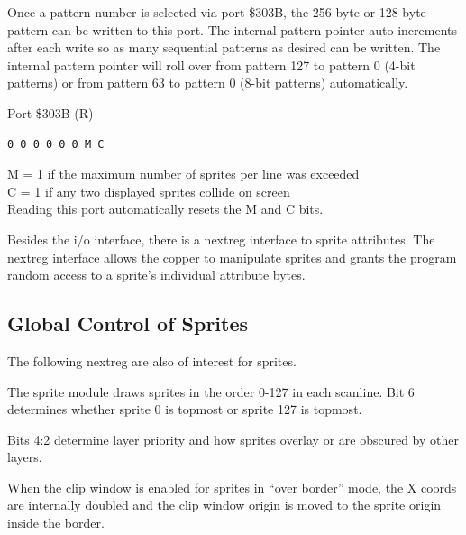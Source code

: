 

Once a pattern number is selected via port \$303B, the 256-byte or
128-byte pattern can be written to this port. The internal pattern
pointer auto-increments after each write so as many sequential
patterns as desired can be written. The internal pattern pointer will
roll over from pattern 127 to pattern 0 (4-bit patterns) or from
pattern 63 to pattern 0 (8-bit patterns) automatically.

Port \$303B (R)

\begin{verbatim}
0 0 0 0 0 0 M C
\end{verbatim}
M = 1 if the maximum number of sprites per line was exceeded\\
C = 1 if any two displayed sprites collide on screen\\
Reading this port automatically resets the M and C bits.

Besides the i/o interface, there is a nextreg interface to sprite
attributes. The nextreg interface allows the copper to manipulate
sprites and grants the program random access to a sprite’s individual
attribute bytes.













\subsection{Global Control of Sprites}

The following nextreg are also of interest for sprites.




The sprite module draws sprites in the order 0-127 in each
scanline. Bit 6 determines whether sprite 0 is topmost or sprite 127
is topmost.

Bits 4:2 determine layer priority and how sprites overlay or are
obscured by other layers.



When the clip window is enabled for sprites in “over border” mode, the
X coords are internally doubled and the clip window origin is moved to
the sprite origin inside the border.

